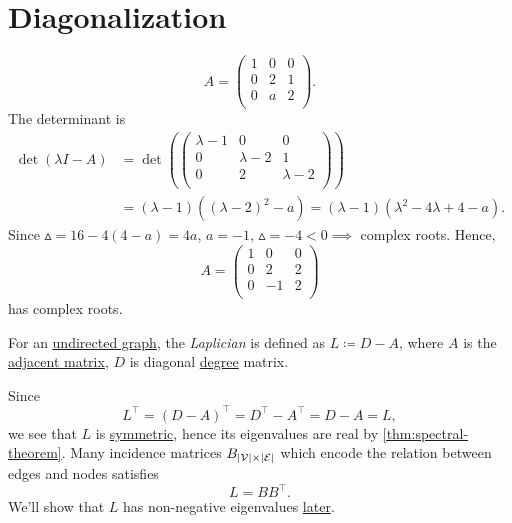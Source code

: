 \section{Diagonalization}
\begin{eg}
	\[
		A = \begin{pmatrix}
			1 & 0 & 0 \\
			0 & 2 & 1 \\
			0 & a & 2 \\
		\end{pmatrix}.
	\]
	The determinant is
	\[
		\begin{split}
			\det(\lambda I - A) &= \det \left(  \begin{pmatrix}
				\lambda - 1 & 0            & 0             \\
				0           & \lambda -  2 & 1             \\
				0           & 2            & \lambda -   2 \\
			\end{pmatrix}\right)\\
			&= (\lambda - 1)((\lambda - 2 )^2 - a) = (\lambda - 1)(\lambda^2 - 4\lambda + 4 - a).
		\end{split}
	\]
	Since \(\vartriangle = 16 - 4(4-a) = 4a\),  \(a = -1\), \(\vartriangle = -4 < 0 \implies\) complex roots. Hence,
	\[
		A = \begin{pmatrix}
			1 & 0  & 0 \\
			0 & 2  & 2 \\
			0 & -1 & 2 \\
		\end{pmatrix}
	\] has complex roots.
\end{eg}

\begin{definition}[Laplician]\label{def:Laplician}
	For an \hyperref[def:undirected-graph]{undirected graph}, the \emph{Laplician} is defined as \(L \coloneqq D - A\), where \(A\) is the \hyperref[def:adjacency-matrix]{adjacent matrix},
	\(D\) is diagonal \hyperref[def:degree]{degree} matrix.
\end{definition}

\begin{remark}
	Since
	\[
		L^{\top} = (D - A)^{\top} = D^{\top} - A^{\top} = D - A = L,
	\]
	we see that \(L\) is \hyperref[def:symmetric-matrix]{symmetric}, hence its eigenvalues are real by \autoref{thm:spectral-theorem}.
	Many incidence matrices \(B_{\left\vert \mathcal{\MakeUppercase{v}} \right\vert \times \left\vert \mathcal{\MakeUppercase{e}} \right\vert }\) which encode the
	relation between edges and nodes satisfies
	\[
		L = BB^{\top}.
	\]
	We'll show that \(L\) has non-negative eigenvalues \hyperref[rmk:Laplacian]{later}.
\end{remark}

